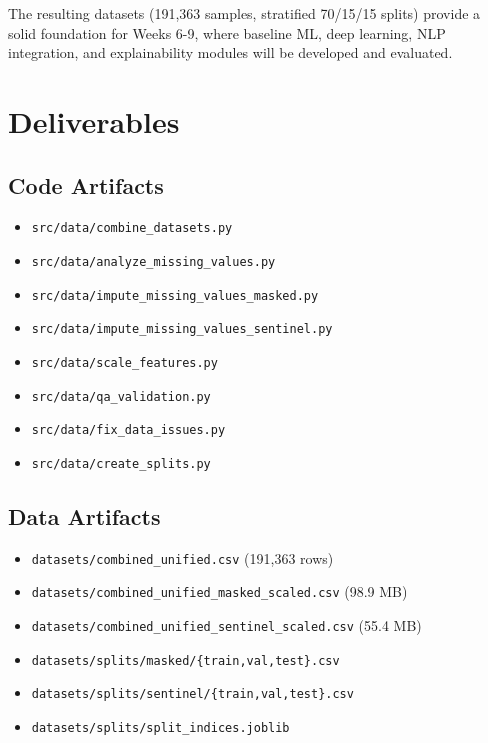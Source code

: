 \documentclass[12pt,a4paper]{article}
\begin{document}
The resulting datasets (191,363 samples, stratified 70/15/15 splits) provide a solid foundation for Weeks 6-9, where baseline ML, deep learning, NLP integration, and explainability modules will be developed and evaluated.

\section{Deliverables}

\subsection{Code Artifacts}
\begin{itemize}
    \item \texttt{src/data/combine\_datasets.py}
    \item \texttt{src/data/analyze\_missing\_values.py}
    \item \texttt{src/data/impute\_missing\_values\_masked.py}
    \item \texttt{src/data/impute\_missing\_values\_sentinel.py}
    \item \texttt{src/data/scale\_features.py}
    \item \texttt{src/data/qa\_validation.py}
    \item \texttt{src/data/fix\_data\_issues.py}
    \item \texttt{src/data/create\_splits.py}
\end{itemize}

\subsection{Data Artifacts}
\begin{itemize}
    \item \texttt{datasets/combined\_unified.csv} (191,363 rows)
    \item \texttt{datasets/combined\_unified\_masked\_scaled.csv} (98.9 MB)
    \item \texttt{datasets/combined\_unified\_sentinel\_scaled.csv} (55.4 MB)
    \item \texttt{datasets/splits/masked/\{train,val,test\}.csv}
    \item \texttt{datasets/splits/sentinel/\{train,val,test\}.csv}
    \item \texttt{datasets/splits/split\_indices.joblib}
\end{itemize}
\end{document}
